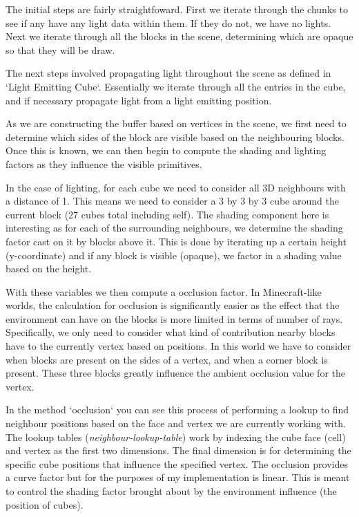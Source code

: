 \documentclass{book}
\begin{document}
The initial steps are fairly straightfoward.  First we iterate through the chunks to see if any have any light data within them.  If they do not, we have no lights.  Next we iterate through all the blocks in the scene, determining which are opaque so that they will be draw.
    
The next steps involved propagating light throughout the scene as defined in `Light Emitting Cube`. Essentially we iterate through all the entries in the cube, and if necessary propagate light from a light emitting position.
    
As we are constructing the buffer based on vertices in the scene, we first need to determine which sides of the block are visible based on the neighbouring blocks.  Once this is known, we can then begin to compute the shading and lighting factors as they influence the visible primitives.
    
In the case of lighting, for each cube we need to consider all 3D neighbours with a distance of 1.  This means we need to consider a 3 by 3 by 3 cube around the current block (27 cubes total including self).  The shading component here is interesting as for each of the surrounding neighbours, we determine the shading factor cast on it by blocks above it.  This is done by iterating up a certain height (y-coordinate) and if any block is visible (opaque), we factor in a shading value based on the height.
    
With these variables we then compute a occlusion factor.  In Minecraft-like worlds, the calculation for occlusion is significantly easier as the effect that the environment can have on the blocks is more limited in terms of number of rays.  Specifically, we only need to consider what kind of contribution nearby blocks have to the currently vertex based on positions.  In this world we have to consider when blocks are present on the sides of a vertex, and when a corner block is present.  These three blocks greatly influence the ambient occlusion value for the vertex.
    
In the method `occlusion` you can see this process of performing a lookup to find neighbour positions based on the face and vertex we are currently working with.  The lookup tables (\textit{neighbour-lookup-table}) work by indexing the cube face (cell) and vertex as the first two dimensions.  The final dimension is for determining the specific cube positions that influence the specified vertex.  The occlusion provides a curve factor but for the purposes of my implementation is linear.  This is meant to control the shading factor brought about by the environment influence (the position of cubes).
    
\end{document}
